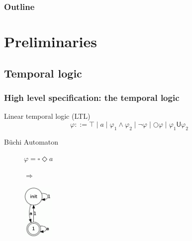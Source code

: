 \documentclass{beamer}
\newcommand{\buchi}[0]{B\"uchi}
\newcommand{\LTLalways}		{\ensuremath{\square}}
\newcommand{\LTLeventually}	{\ensuremath{\Diamond}}
\newcommand{\LTLuntil}		{\ensuremath{\mathsf{U}}}
\newcommand{\LTLnext}		{\ensuremath{\bigcirc}}
\newcommand{\true}			{\ensuremath{\top}}
\begin{document}
\begin{frame}
\frametitle{Outline}
\tableofcontents
\end{frame}


\section{Preliminaries}


\newcommand{\planframe}[1]{
\begin{frame}
\begin{figure}
\def\framenbre{#1}

\end{figure}
\end{frame}
}

\planframe{0}

\subsection{Temporal logic}

\begin{frame}
\frametitle{High level specification: the temporal logic}
\begin{block}{Linear temporal logic (LTL)}
$$ \varphi ::= 
\true \mid 
a \mid 
\varphi_1 \land \varphi_2 \mid
\lnot \varphi \mid
\LTLnext \varphi \mid
\varphi_1 \LTLuntil \varphi_2$$
\end{block}
\pause

\begin{block}{\buchi{} Automaton}

\end{block}

\begin{figure}
\begin{minipage}{0.45\textwidth}
$\varphi = \LTLalways \LTLeventually a$
\end{minipage}
{\LARGE$\Rightarrow$}%
\begin{minipage}{0.45\textwidth}
\hspace*{1cm}
\includegraphics[width=1.5cm]{buchi}
\end{minipage}
\end{figure}

\end{frame}
\end{document}
